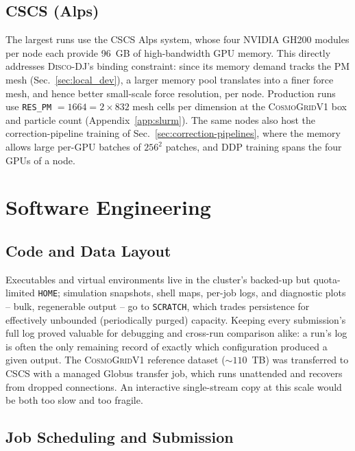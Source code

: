 \documentclass{report}
\begin{document}
\subsection{CSCS (Alps)}

The largest runs use the CSCS Alps system, whose four NVIDIA GH200 modules per node each provide 96~GB of high-bandwidth GPU memory. This directly addresses \textsc{Disco-DJ}'s binding constraint: since its memory demand tracks the PM mesh (Sec.~\ref{sec:local_dev}), a larger memory pool translates into a finer force mesh, and hence better small-scale force resolution, per node. Production runs use \texttt{RES\_PM} $= 1664 = 2\times832$ mesh cells per dimension at the \textsc{CosmoGridV1} box and particle count (Appendix~\ref{app:slurm}). The same nodes also host the correction-pipeline training of Sec.~\ref{sec:correction-pipelines}, where the memory allows large per-GPU batches of $256^2$ patches, and DDP training spans the four GPUs of a node.

\section{Software Engineering}
\subsection{Code and Data Layout}

Executables and virtual environments live in the cluster's backed-up but quota-limited \texttt{HOME}; simulation snapshots, shell maps, per-job logs, and diagnostic plots -- bulk, regenerable output -- go to \texttt{SCRATCH}, which trades persistence for effectively unbounded (periodically purged) capacity. Keeping every submission's full log proved valuable for debugging and cross-run comparison alike: a run's log is often the only remaining record of exactly which configuration produced a given output. The \textsc{CosmoGridV1} reference dataset (\mbox{$\sim110$}~TB) was transferred to CSCS with a managed Globus transfer job, which runs unattended and recovers from dropped connections. An interactive single-stream copy at this scale would be both too slow and too fragile.

\subsection{Job Scheduling and Submission}
\end{document}
